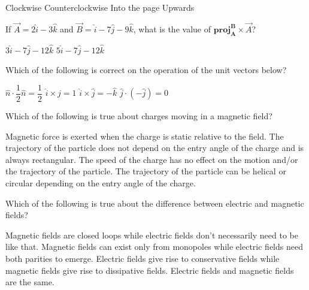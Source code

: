 \documentclass[12pt,addpoints]{exam}
\begin{document}
{{{\begin{questions}
\begin{center}
					\end{center}
					\begin{oneparchoices}
						\choice Clockwise
						\choice Counterclockwise
						\choice Into the page
						\choice Upwards
					\end{oneparchoices}
					\question If $\vec{A}=2\hat{i}-3\hat{k}$ and $\vec{B}=\hat{i}-7\hat{j}-9\hat{k}$, what is the value of $\textbf{proj}^{\textbf{B}}_{\textbf{A}}\times\vec{A}$? \\
					\begin{oneparchoices}
						\choice $3\hat{i}-7\hat{j}-12\hat{k}$
						\choice 1
						\choice $5\hat{i}-7\hat{j}-12\hat{k}$
						\choice 0
					\end{oneparchoices}
					\question Which of the following is correct on the operation of the unit vectors below? \\
					\begin{oneparchoices}
						\choice $\hat{n}\cdot\dfrac{1}{2}\hat{n}=\dfrac{1}{2}$
						\choice $\hat{i}\times\hat{j}=1$
						\choice $\hat{i}\times\hat{j}=-\hat{k}$
						\choice $\hat{j}\cdot(-\hat{j})=0$
					\end{oneparchoices}
					\question Which of the following is true about charges moving in a magnetic field?
					\begin{choices}
						\choice Magnetic force is exerted when the charge is static relative to the field.
						\choice The trajectory of the particle does not depend on the entry angle of the charge and is always rectangular.
						\choice The speed of the charge has no effect on the motion and/or the trajectory of the particle.
						\choice The trajectory of the particle can be helical or circular depending on the entry angle of the charge.
					\end{choices}
					\question Which of the following is true about the difference between electric and magnetic fields?
					\begin{choices}
						\choice Magnetic fields are closed loops while electric fields don't necessarily need to be like that.
						\choice Magnetic fields can exist only from monopoles while electric fields need both parities to emerge.
						\choice Electric fields give rise to conservative fields while magnetic fields give rise to dissipative fields.
						\choice Electric fields and magnetic fields are the same.
					\end{choices}

\end{questions}}}}
\end{document}
